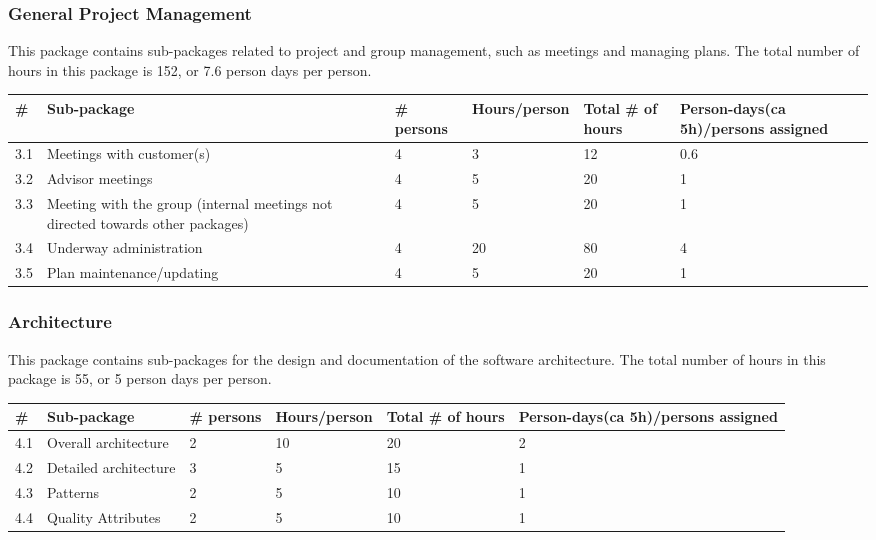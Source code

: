 \subsubsection{General Project Management}
This package contains sub-packages related to project and group management, such as meetings and managing plans. The total number of hours in this package is 152, or 7.6 person days per person.
\begin{longtable}{|p{0.7cm}|p{3cm}|p{1.8cm}|p{2.5cm}|p{2cm}|p{2.8cm}|}
\hline
\# & Sub-package & \# persons & Hours/person & Total \# of hours & Person-days(ca 5h)/persons assigned\\ 
\hline
3.1 & Meetings with customer(s)  & 4 & 3 & 12 & 0.6\\ 
\hline
3.2 & Advisor meetings  & 4 & 5 & 20 & 1\\ 
\hline
3.3 & Meeting with the group (internal meetings not directed towards other packages) & 4 & 5 & 20 & 1\\ 
\hline
3.4 & Underway administration & 4 & 20 & 80 & 4\\ 
\hline
3.5 & Plan maintenance/updating & 4 & 5 & 20 & 1\\ 
\hline
\end{longtable}

\subsubsection{Architecture}
This package contains sub-packages for the design and documentation of the software architecture. The total number of hours in this package is 55, or 5 person days per person.
\begin{longtable}{|p{0.7cm}|p{3cm}|p{1.8cm}|p{2.5cm}|p{2cm}|p{2.8cm}|}
\hline
\# & Sub-package & \# persons & Hours/person & Total \# of hours & Person-days(ca 5h)/persons assigned\\ 
\hline
4.1 & Overall architecture & 2 & 10 & 20 & 2\\ 
\hline
4.2 & Detailed architecture & 3 & 5 & 15 & 1\\ 
\hline
4.3 & Patterns & 2 & 5 & 10 & 1\\ 
\hline
4.4 & Quality Attributes & 2 & 5 & 10 & 1\\ 
\hline
\end{longtable}

